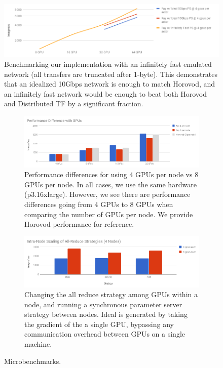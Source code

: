 \begin{figure}[tb]
    \centering
    \includegraphics[width=5.1in,keepaspectratio]{fig/infnet.png}
    \caption{
    \small{
        Benchmarking our implementation with an infinitely fast emulated network (all transfers are truncated after 1-byte). This demonstrates that an idealized 10Gbps network is enough to match Horovod, and an infinitely fast network would be enough to beat both Horovod and Distributed TF by a significant fraction.
    }
    }
    \label{fig:infnet}
\end{figure}


\begin{figure}
\begin{subfigure}{0.45\textwidth}
\includegraphics[width=1\textwidth]{fig/4to8.png}
    \caption{
    \small{
        Performance differences for using 4 GPUs per node vs 8 GPUs per node. In all cases, we use the same hardware (p3.16xlarge). However, we see there are performance differences going from 4 GPUs to 8 GPUs when comparing the number of GPUs per node. We provide Horovod performance for reference.
    }
    }
    \label{fig:8-vs-4-gpu}
\end{subfigure}\hspace{\fill}
\begin{subfigure}{0.45\textwidth}
\includegraphics[width=1\textwidth]{fig/intranode.png}
    \caption{ \small{ Changing the all reduce strategy among GPUs within a node,
        and running a synchronous parameter server strategy between nodes. Ideal
        is generated by taking the gradient of the a single GPU, bypassing any
        communication overhead between GPUs on a single machine.  } }

    \label{fig:intra-node-allreduce-strategy}
\end{subfigure}
\caption{Microbenchmarks.}

\end{figure}
